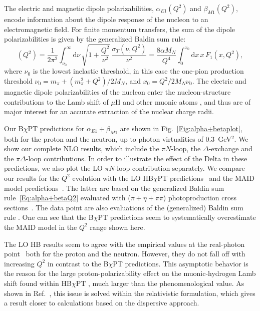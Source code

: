 \documentclass[12pt,preprint,tightenlines,
showpacs,preprintnumbers,amsmath,amssymb,
a4paper,nofootinbib]{revtex4-1}
\def\beq{\begin{equation}}
\def\eeq{\end{equation}}
\def\al{\alpha}
\def\dd{\mathrm{d}}
\begin{document}
The electric and magnetic dipole polarizabilities, $\alpha_{E1}(Q^2)$ and $\beta_{M1}(Q^2)$, encode information about the dipole response of the nucleon to an electromagnetic field. For finite momentum transfers, the sum of the dipole polarizabilities is given by the generalized Baldin sum rule:
\beq
[\alpha_{E1}+\beta_{M1}] (Q^2)= \frac{1}{2 \pi^2} \int_{\nu_0}^\infty \! \dd\nu\,\sqrt{1+\frac{Q^2}{\nu^2}}\, \frac{\sigma_T (\nu,Q^2)}{\nu^2} =\frac{8 \al M_N}{Q^4}\int_0^{x_0}\!\dd x\, x \,F_1(x,Q^2),\label{Eq:alpha+betaQ2}
\eeq
where $\nu_0$ is the lowest inelastic threshold, in this case the one-pion production threshold $\nu_0=m_\pi + (m_\pi^2+Q^2)/2M_N$, and $x_0=Q^2/2M_N \nu_0$.
The electric and magnetic dipole polarizabilities of the nucleon enter the nucleon-structure contributions
to the Lamb shift of $\mu$H and other muonic atoms \cite{Bernabeu:1982qy,Pachucki:1996zza,Carlson:2011zd,Alarcon:2013cba}, and thus
are of major interest for an accurate extraction of the nuclear charge radii.

Our B$\chi$PT predictions for $\alpha_{E1}+\beta_{M1}$ are shown in Fig.~\ref{Fig:alpha+betaplot}, both for the proton
and the neutron, up to photon virtualities of $0.3$~GeV$^2$. We show our complete NLO results, which include the $\pi N$-loop, the $\Delta$-exchange and the $\pi \Delta$-loop contributions. In order to illustrate the effect of the Delta in these predictions, we also plot the LO $\pi N$-loop contribution
separately. We compare our results for the $Q^2$
evolution with the LO HB$\chi$PT predictions~\cite{Nevado:2007dd} and the MAID model predictions~\cite{Drechsel:2000ct,Drechsel:1998hk}. The latter are based on the generalized Baldin sum rule~\eqref{Eq:alpha+betaQ2} evaluated with ($\pi+\eta+\pi \pi$) photoproduction
cross sections~\cite{Drechsel:2002ar}. 
The data point are also evaluations of the (generalized) Baldin sum rule \cite{Liang:2004tk,Gryniuk:2015aa,Babusci:1997ij}. One can see that the B$\chi$PT predictions seem to systematically overestimate the MAID model in the $Q^2$ range shown here. 

The LO HB results seem to agree with the empirical values at the real-photon point~\cite{Babusci:1997ij}
both for the proton and the neutron. However, they do not fall off with increasing $Q^2$ in contrast to the B$\chi$PT predictions.
This asymptotic behavior is the reason for the large proton-polarizability effect on the muonic-hydrogen Lamb shift found within HB$\chi$PT \cite{Nevado:2007dd,Peset:2014yha}, much larger than the phenomenological value. As shown in Ref.~\cite{Alarcon:2013cba,Lensky:2017bwi}, this issue is solved within the relativistic formulation, which gives a result closer to calculations based on the dispersive approach.
\end{document}
